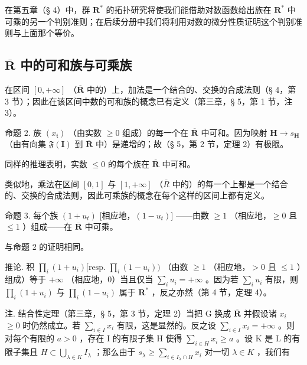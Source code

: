 在第五章（§ 4）中，群 \(\mathbf{R}^*\) 的拓扑研究将使我们能借助对数函数给出族在 \(\mathbf{R}^*\) 中可乘的另一个判别准则；在后续分册中我们将利用对数的微分性质证明这个判别准则与上面那个等价。

\subsection{\texorpdfstring{\(\overline{\mathbf{R}}\) 中的可和族与可乘族}{SUMMABLE FAMILIES AND MULTIPLIABLE FAMILIES IN \textbackslash overline\{\textbackslash mathbf\{R\}\}}}

在区间 \([0, +\infty]\) （\(\overline{\mathbf{R}}\) 中的）上，加法是一个结合的、交换的合成法则（§ 4，第 3 节）；因此在该区间中数的可和族的概念已有定义（第三章，§ 5，第 1 节，注 3）。

命题 2. 族 \((x_{\mathfrak{t}})\) （由实数 \(\geqslant 0\) 组成）的每一个在 \(\overline{\mathbf{R}}\) 中可和。因为映射 \(\mathbf{H} \to s_{\mathbf{H}}\) （由有向集 \(\mathfrak{F}(\mathbf{I})\) 到 \(\overline{\mathbf{R}}\) 中）是递增的；故（§ 5，第 2 节，定理 2）有极限。

同样的推理表明，实数 \(\leqslant 0\) 的每个族在 \(\overline{\mathbf{R}}\) 中可和。

类似地，乘法在区间 \([0, 1]\) 与 \([1, +\infty]\) （\(\overline{R}\) 中的）的每一个上都是一个结合的、交换的合成法则，因此可乘族的概念在每个这样的区间上都有定义。

命题 3. 每个族 \((1 + u_{t})\) {[}相应地，\((1 - u_{t})]\) ——由数 \(\geqslant 1\) （相应地，\(\geqslant 0\) 且 \(\leqslant 1\) ）组成——在 \(\overline{\mathbf{R}}\) 中可乘。

与命题 2 的证明相同。

推论. 积 \(\prod_{i} (1 + u_i) [\text{resp. } \prod_{i} (1 - u_i))\) （由数 \(\geqslant 1\) （相应地，\(>0\) 且 \(\leqslant 1\) ）组成）等于 \(+\infty\) （相应地，0）当且仅当 \(\sum_{i} u_i = +\infty\) 。因为若 \(\sum_{i} u_i\) 有限，则 \(\prod_{i} (1 + u_i)\) 与 \(\prod_{i} (1 - u_i)\) 属于 \(\mathbf{R}^*\) ，反之亦然（第 4 节，定理 4）。

注. 结合性定理（第三章，§ 5，第 3 节，定理 2）当把 G 换成 \(\overline{\mathbf{R}}\) 并假设诸 \(x_{i}\) \(\geqslant 0\) 时仍然成立。若 \(\sum_{i \in I} x_{i}\) 有限，这是显然的。反之设 \(\sum_{i \in I} x_{i} = +\infty\) 。则对每个有限的 \(a > 0\) ，存在 I 的有限子集 H 使得 \(\sum_{i \in H} x_{i} \geqslant a\) 。设 K 是 L 的有限子集且 \(H \subset \bigcup_{\lambda \in K} I_{\lambda}\) ；那么由于 \(s_{\lambda} \geqslant \sum_{i \in I_{\lambda} \cap H} x_{i}\) 对一切 \(\lambda \in K\) ，我们有

